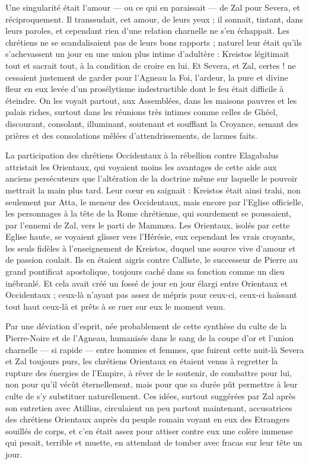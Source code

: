 \documentclass[a4paper, 11pt, oneside, polutonikogreek, french]{article}
\begin{document}
Une singularité était l'amour --- ou ce qui en paraissait --- de Zal pour Severa, et réciproquement. Il transsudait, cet amour, de leurs yeux ; il sonnait, tintant, dans leurs paroles, et cependant rien d'une relation charnelle ne s'en échappait. Les chrétiens ne se scandalisaient pas de leurs bons rapports ; naturel leur était qu'ils s'achevassent un jour en une union plus intime d'adultère : Kreistos légitimait tout et sacrait tout, à la condition de croire en lui. Et Severa, et Zal, certes ! ne cessaient justement de garder pour l'Agneau la Foi, l'ardeur, la pure et divine fleur en eux levée d'un prosélytisme indestructible dont le feu était difficile à éteindre. On les voyait partout, aux Assemblées, dans les maisons pauvres et les palais riches, surtout dans les réunions très intimes comme celles de Ghéel, discourant, consolant, illuminant, soutenant et soufflant la Croyance, semant des prières et des consolations mêlées d'attendrissements, de larmes faits.

La participation des chrétiens Occidentaux à la rébellion contre Elagabalus attristait les Orientaux, qui voyaient moins les avantages de cette aide aux anciens persécuteurs que l'altération de la doctrine même sur laquelle le pouvoir mettrait la main plus tard. Leur cœur en saignait : Kreistos était ainsi trahi, non seulement par Atta, le meneur des Occidentaux, mais encore par l'Eglise officielle, les personnages à la tête de la Rome chrétienne, qui sourdement se poussaient, par l'ennemi de Zal, vers le parti de Mammæa. Les Orientaux, isolés par cette Eglise haute, se voyaient glisser vers l'Hérésie, eux cependant les vrais croyants, les seuls fidèles à l'enseignement de Kreistos, duquel une source vive d'amour et de passion coulait. Ils en étaient aigris contre Calliste, le successeur de Pierre au grand pontificat apostolique, toujours caché dans sa fonction comme un dieu inébranlé. Et cela avait créé un fossé de jour en jour élargi entre Orientaux et Occidentaux ; ceux-là n'ayant pas assez de mépris pour ceux-ci, ceux-ci haïssant tout haut ceux-là et prêts à se ruer sur eux le moment venu.

Par une déviation d'esprit, née probablement de cette synthèse du culte de la Pierre-Noire et de l'Agneau, humanisée dans le sang de la coupe d'or et l'union charnelle --- si rapide --- entre hommes et femmes, que fuirent cette nuit-là Severa et Zal toujours purs, les chrétiens Orientaux en étaient venus à regretter la rupture des énergies de l'Empire, à rêver de le soutenir, de combattre pour lui, non pour qu'il vécût éternellement, mais pour que sa durée pût permettre à leur culte de s'y substituer naturellement. Ces idées, surtout suggérées par Zal après son entretien avec Atillius, circulaient un peu partout maintenant, accusatrices des chrétiens Orientaux auprès du peuple romain voyant en eux des Etrangers souillés de corps, et c'en était assez pour attiser contre eux une colère immense qui pesait, terrible et muette, en attendant de tomber avec fracas sur leur tête un jour.
\end{document}
